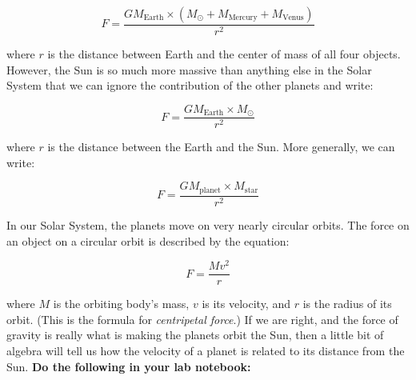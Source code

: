 \documentclass[11pt]{article}%
\begin{document}
\begin{equation}
F = \frac{G M_{\textrm{Earth}} \times (M_{\odot} + M_{\textrm{Mercury}} + M_{\textrm{Venus}})}{r^2}
\end{equation}

\noindent where $r$ is the distance between Earth and the center of mass of all four objects. However, the Sun is so much more massive than anything else in the Solar System that we can ignore the contribution of the other planets and write:

\begin{equation}
F = \frac{G M_{\textrm{Earth}} \times M_{\odot}}{r^2}
\end{equation}

\noindent where $r$ is the distance between the Earth and the Sun. More generally, we can write:

\begin{equation} \label{eq:grav}
F = \frac{G M_{\textrm{planet}} \times M_{\textrm{star}}}{r^2}
\end{equation}


\noindent In our Solar System, the planets move on very nearly circular orbits. The force on an object on a circular orbit is described by the equation:

\begin{equation} \label{eq:CF}
F = \frac{M v^2}{r}
\end{equation}

\noindent where $M$ is the orbiting body's mass, $v$ is its velocity, and $r$ is the radius of its orbit. (This is the formula for \textit{centripetal force}.) If we are right, and the force of gravity is really what is making the planets orbit the Sun, then a little bit of algebra will tell us how the velocity of a planet is related to its distance from the Sun.  \textbf{Do the following in your lab notebook:}
\end{document}
